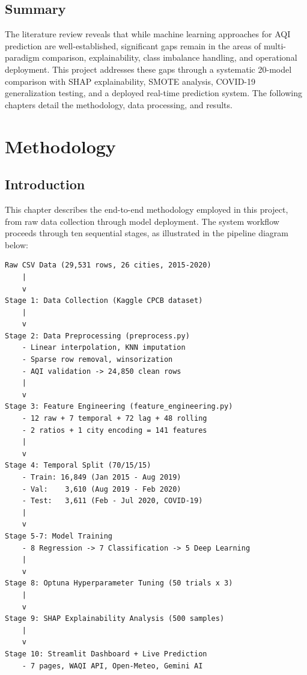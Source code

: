 \documentclass[12pt,a4paper]{report}
\begin{document}
\section{Summary}

The literature review reveals that while machine learning approaches for AQI prediction are well-established, significant gaps remain in the areas of multi-paradigm comparison, explainability, class imbalance handling, and operational deployment. This project addresses these gaps through a systematic 20-model comparison with SHAP explainability, SMOTE analysis, COVID-19 generalization testing, and a deployed real-time prediction system. The following chapters detail the methodology, data processing, and results.

\clearpage
\chapter{Methodology}\label{idx:ch4}

\section{Introduction}

This chapter describes the end-to-end methodology employed in this project, from raw data collection through model deployment. The system workflow proceeds through ten sequential stages, as illustrated in the pipeline diagram below:

\begin{lstlisting}[frame=single, basicstyle=\small\ttfamily, caption={System Workflow Pipeline}]
Raw CSV Data (29,531 rows, 26 cities, 2015-2020)
    |
    v
Stage 1: Data Collection (Kaggle CPCB dataset)
    |
    v
Stage 2: Data Preprocessing (preprocess.py)
    - Linear interpolation, KNN imputation
    - Sparse row removal, winsorization
    - AQI validation -> 24,850 clean rows
    |
    v
Stage 3: Feature Engineering (feature_engineering.py)
    - 12 raw + 7 temporal + 72 lag + 48 rolling
    - 2 ratios + 1 city encoding = 141 features
    |
    v
Stage 4: Temporal Split (70/15/15)
    - Train: 16,849 (Jan 2015 - Aug 2019)
    - Val:    3,610 (Aug 2019 - Feb 2020)
    - Test:   3,611 (Feb - Jul 2020, COVID-19)
    |
    v
Stage 5-7: Model Training
    - 8 Regression -> 7 Classification -> 5 Deep Learning
    |
    v
Stage 8: Optuna Hyperparameter Tuning (50 trials x 3)
    |
    v
Stage 9: SHAP Explainability Analysis (500 samples)
    |
    v
Stage 10: Streamlit Dashboard + Live Prediction
    - 7 pages, WAQI API, Open-Meteo, Gemini AI
\end{lstlisting}
\end{document}
